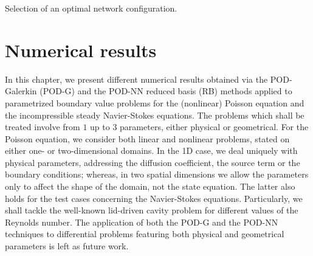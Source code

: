 \documentclass[12pt, a4paper, twoside, openright]{report}
\numberwithin{equation}{chapter}
\theoremstyle{theorem}
\theoremstyle{definition}
\theoremstyle{remark}
\theoremstyle{proposition}
\numberwithin{figure}{chapter}
\begin{document}
\begin{algorithm}[H]
\begin{algorithmic}[1]
			\end{algorithmic}
			
			\caption{Selection of an optimal network configuration.}
			\label{alg:podnn-training}
		\end{algorithm}
		
	\chapter{Numerical results}
	\label{chapter:Numerical results}
	
		In this chapter, we present different numerical results obtained via the POD-Galerkin (POD-G) and the POD-NN reduced basis (RB) methods applied to parametrized boundary value problems for the (nonlinear) Poisson equation and the incompressible steady Navier-Stokes equations. The problems which shall be treated involve from $1$ up to $3$ parameters, either physical or geometrical. For the Poisson equation, we consider both linear and nonlinear problems, stated on either one- or two-dimensional domains. In the 1D case, we deal uniquely with physical parameters, addressing the diffusion coefficient, the source term or the boundary conditions; whereas, in two spatial dimensions we allow the parameters only to affect the shape of the domain, not the state equation. The latter also holds for the test cases concerning the Navier-Stokes equations. Particularly, we shall tackle the well-known lid-driven cavity problem for different values of the Reynolds number. The application of both the POD-G and the POD-NN techniques to differential problems featuring both physical and geometrical parameters is left as future work.
		
\end{document}
